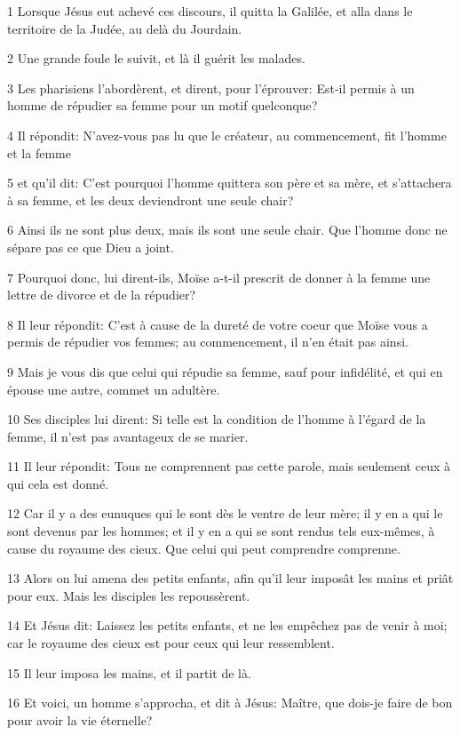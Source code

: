 \par 1 Lorsque Jésus eut achevé ces discours, il quitta la Galilée, et alla dans le territoire de la Judée, au delà du Jourdain.
\par 2 Une grande foule le suivit, et là il guérit les malades.
\par 3 Les pharisiens l'abordèrent, et dirent, pour l'éprouver: Est-il permis à un homme de répudier sa femme pour un motif quelconque?
\par 4 Il répondit: N'avez-vous pas lu que le créateur, au commencement, fit l'homme et la femme
\par 5 et qu'il dit: C'est pourquoi l'homme quittera son père et sa mère, et s'attachera à sa femme, et les deux deviendront une seule chair?
\par 6 Ainsi ils ne sont plus deux, mais ils sont une seule chair. Que l'homme donc ne sépare pas ce que Dieu a joint.
\par 7 Pourquoi donc, lui dirent-ils, Moïse a-t-il prescrit de donner à la femme une lettre de divorce et de la répudier?
\par 8 Il leur répondit: C'est à cause de la dureté de votre coeur que Moïse vous a permis de répudier vos femmes; au commencement, il n'en était pas ainsi.
\par 9 Mais je vous dis que celui qui répudie sa femme, sauf pour infidélité, et qui en épouse une autre, commet un adultère.
\par 10 Ses disciples lui dirent: Si telle est la condition de l'homme à l'égard de la femme, il n'est pas avantageux de se marier.
\par 11 Il leur répondit: Tous ne comprennent pas cette parole, mais seulement ceux à qui cela est donné.
\par 12 Car il y a des eunuques qui le sont dès le ventre de leur mère; il y en a qui le sont devenus par les hommes; et il y en a qui se sont rendus tels eux-mêmes, à cause du royaume des cieux. Que celui qui peut comprendre comprenne.
\par 13 Alors on lui amena des petits enfants, afin qu'il leur imposât les mains et priât pour eux. Mais les disciples les repoussèrent.
\par 14 Et Jésus dit: Laissez les petits enfants, et ne les empêchez pas de venir à moi; car le royaume des cieux est pour ceux qui leur ressemblent.
\par 15 Il leur imposa les mains, et il partit de là.
\par 16 Et voici, un homme s'approcha, et dit à Jésus: Maître, que dois-je faire de bon pour avoir la vie éternelle?
